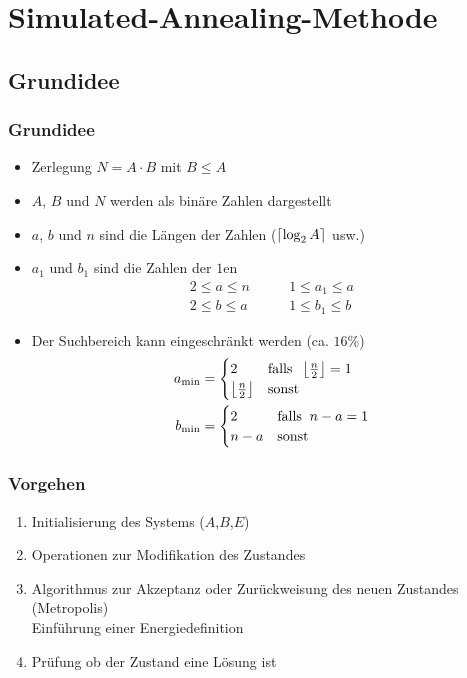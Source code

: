 \section{Simulated-Annealing-Methode}

\subsection*{Grundidee}
\begin{frame}
  \frametitle{Grundidee}
  \begin{itemize}
    \item Zerlegung $N=A\cdot B$ mit $B \leq A$
    \pause{}
    \item $A$, $B$ und $N$ werden als binäre Zahlen dargestellt
    \pause{}
    \item $a$, $b$ und $n$ sind die Längen der Zahlen ($\left\lceil\log_2 A\right\rceil$ usw.)
    \pause{}
    \item $a_1$ und $b_1$ sind die Zahlen der $1$en
      \begin{align*}
        2 \leq a \leq n \quad&\quad 1 \leq a_1 \leq a \\
        2 \leq b \leq a \quad&\quad	1 \leq b_1 \leq b
      \end{align*}
    \pause{}
    \item Der Suchbereich kann eingeschränkt werden (ca. $16\%$)
      \begin{align*}
        a_{\min}&=\begin{cases} 2 & \mathrm{falls}\;\; \left\lfloor\frac{n}{2}\right\rfloor=1 \\ \left\lfloor\frac{n}{2}\right\rfloor & \mathrm{sonst} \end{cases} \\
        b_{\min}&=\begin{cases} 2 & \mathrm{falls}\;\; n-a=1 \\ n-a & \mathrm{sonst} \end{cases}
      \end{align*}
  \end{itemize}
\end{frame}

\begin{frame}
  \frametitle{Vorgehen}
  \begin{enumerate}
    \setlength{\itemsep}{0.3cm}

    \item Initialisierung des Systems ($A$,$B$,$E$)
    \pause{}
    \item Operationen zur Modifikation des Zustandes
    \pause{}
    \item Algorithmus zur Akzeptanz oder Zurückweisung des neuen Zustandes (Metropolis) \\
          \pause{}
          \Rightarrow{} Einführung einer Energiedefinition
    \pause{}
    \item Prüfung ob der Zustand eine Lösung ist
  \end{enumerate}
\end{frame}

